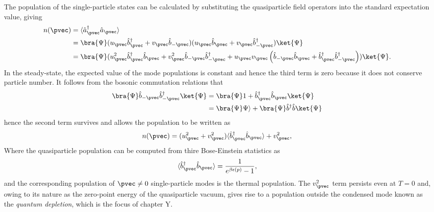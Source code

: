 {{{{{{	The population of the single-particle states can be calculated by substituting the quasiparticle field operators into the standard expectation value, giving
	\begin{align}
		n(\pvec) &= \langle\hat{a}^\dagger_\pvec \hat{a}_\pvec\rangle\\
		&= \bra{\Psi}(u_\pvec\hat{b}_\pvec^\dagger + v_\pvec \hat{b}_{-\pvec})(u_\pvec \hat{b}_\pvec + v_\pvec \hat{b}^\dagger_{-\pvec})\ket{\Psi}\\
		&=\bra{\Psi}(u_\pvec^2\hat{b}_\pvec^\dagger \hat{b}_\pvec  + v_\pvec^2 \hat{b}_{-\pvec} \hat{b}^\dagger_{-\pvec} + u_\pvec v_\pvec \left(\hat{b}_{-\pvec} \hat{b}_\pvec + \hat{b}_\pvec^\dagger  \hat{b}^\dagger_{-\pvec}\right))\ket{\Psi}.
	\end{align}
	In the steady-state, the expected value of the mode populations is constant and hence the third term is zero because it does not conserve particle number. It follows from the bosonic commutation relations that
	\begin{align}
		\bra{\Psi} \hat{b}_{-\pvec} \hat{b}^\dagger_{-\pvec}\ket{\Psi} &= \bra{\Psi} 1 + \hat{b}_\pvec^\dagger \hat{b}_\pvec\ket{\Psi}\\
								&= \bra{\Psi}\Psi\rangle  + \bra{\Psi}\hat{b}^\dagger \hat{b}\ket{\Psi}
	\end{align}
	hence the second term survives and allows the population to be written as
	\begin{equation}
		n(\pvec) = (u_\pvec^2+v_\pvec^2)\langle\hat{b}_\pvec^\dagger \hat{b}_\pvec\rangle + v_\pvec^2,
	\end{equation}
	Where the quasiparticle population can be computed from thire Bose-Einstein statistics as
	\begin{equation}
		\langle\hat{b}^\dagger_\pvec \hat{b}_\pvec\rangle = \frac{1}{e^{\beta \epsilon(p)}-1},
	\end{equation}
	and the corresponding population of $\pvec\neq0$ single-particle modes is the thermal population. The $v_\pvec^2$ term persists even at $T=0$ and, owing to its nature as the zero-point energy of the quasiparticle vacuum, gives rise to a population outside the condensed mode known as the \emph{quantum depletion}, which is the focus of chapter Y.


	
}}}}}}
